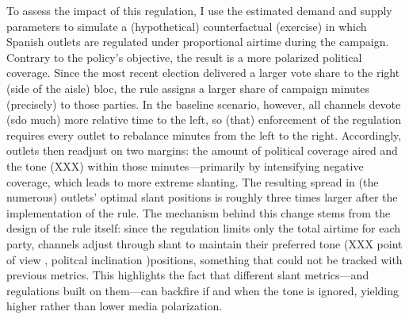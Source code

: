 \documentclass[12pt]{article}
\begin{document}
	To assess the impact of this regulation, I use the estimated demand and supply parameters to simulate a (hypothetical) counterfactual (exercise) in which Spanish outlets are regulated under proportional airtime during the campaign. Contrary to the policy's objective, the result is a more polarized political coverage. Since the most recent election delivered a larger vote share to the right (side of the aisle) bloc, the rule assigns a larger share of campaign minutes (precisely) to those parties. In the baseline scenario, however,  all channels devote (sdo much) more relative time to the left, so (that) enforcement of the regulation requires every outlet to rebalance minutes from the left to the right. Accordingly, outlets then readjust on two margins:  the amount of political coverage aired and the tone (XXX) within those minutes—primarily by intensifying negative coverage, which leads to more extreme slanting. The resulting spread in (the numerous) outlets’ optimal slant positions is roughly three times larger after the implementation of the rule. The mechanism behind this change stems from the design of the rule itself: since the regulation limits only the total airtime for each party, channels adjust through slant to maintain their preferred tone (XXX point of view , politcal inclination )positions, something that could not be tracked with previous metrics.  This highlights the fact that different slant metrics—and regulations built on them—can backfire if and when the tone is ignored, yielding higher rather than lower media polarization.
	
\end{document}
